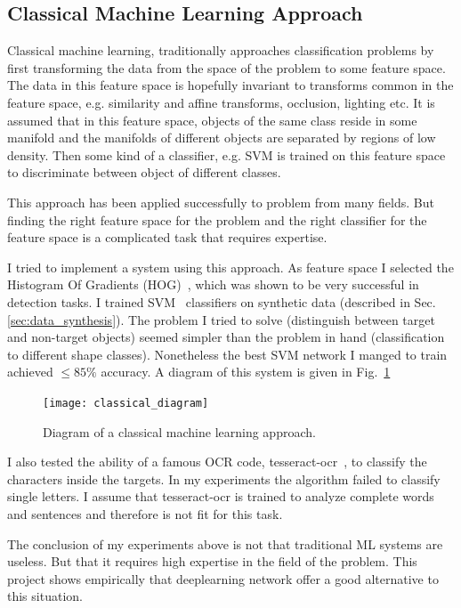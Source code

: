 \documentclass{article} %
\begin{document}
\subsection{Classical Machine Learning Approach}
\label{sec:classical_mv_solution}

Classical machine learning, traditionally approaches classification problems
by first transforming the data from the space of the problem to some feature
space. The data in this feature space is hopefully invariant to transforms common
in the feature space, e.g. similarity and affine transforms, occlusion, lighting
etc. It is assumed that in this feature space, objects of the same class reside
in some manifold and the manifolds of different objects are separated by regions
of low density.
Then some kind of a classifier, e.g. SVM is trained on this feature space to
discriminate between object of different classes.

This approach has been applied successfully to problem from many fields. But
finding the right
feature space for the problem and the right classifier for the feature space is
a complicated task that requires expertise.

I tried to implement a system using this approach. As feature space I
selected the Histogram Of Gradients (HOG)~\cite{1467360}, which was shown to
be very successful in detection tasks. I trained SVM~\cite{Cortes:1995:SN:218919.218929}
classifiers on synthetic data (described in Sec.\ref{sec:data_synthesis}). The
problem I tried to solve (distinguish between target and non-target objects) seemed
simpler than the problem in hand (classification to different shape classes). Nonetheless
the best SVM network I manged to train achieved $\le 85\%$ accuracy. A diagram
of this system is given in Fig.~\ref{fig:classical}
\begin{figure}[h]
	\centering
	\texttt{[image: classical\_diagram]}
	\caption{Diagram of a classical machine learning approach.}
	\label{fig:classical}
\end{figure}

I also tested the ability of a famous OCR code, tesseract-ocr~\cite{4376991}, to
classify the characters inside the targets. In my experiments the algorithm failed
to classify single letters. I assume that tesseract-ocr is trained to analyze complete
words and sentences and therefore is not fit for this task.

The conclusion of my experiments above is not that traditional ML systems
are useless. But that it requires high expertise in the field of the problem. This
project shows empirically that deeplearning network offer a good alternative to this
situation. 
\end{document}
